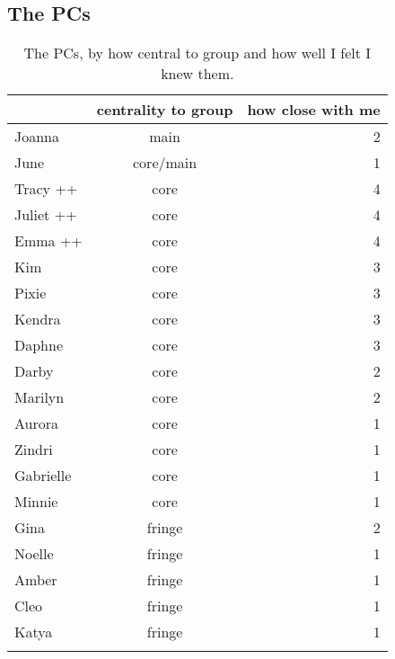 \subsection {The PCs}
\nopagebreak
\begin{table}[ht]
\caption{The PCs, by how central to group and how well I felt I knew them.}\label{PCnames}
	\centering
		\begin{tabular}{lcr} \\
		\lsptoprule
		
			\multirow{2}{*}{\sc name} & \multicolumn{1}{p{2cm}}{\centering \sc centrality to group} & \multicolumn{1}{p{1.75cm}}{\centering \sc how close with me}  \\
			\midrule
			
			Joanna		&		main		&		2  \\\hline
			June			&		core/main &  1 \\\hline
			Tracy ++			&		core		&		4 \\\hline
			Juliet ++	&   core		&		4 \\\hline
			Emma ++		&		core		&		4 \\\hline
			Kim				&		core		&		3 \\\hline
			Pixie			&		core		&		3 \\\hline
			Kendra		&		core		&		3 \\\hline
			Daphne		&		core		&		3 \\\hline
			Darby   	&		core		&		2 \\\hline
			Marilyn 	&		core		&		2 \\\hline
			Aurora		&		core		&		1 \\\hline
			Zindri		&		core		&		1 \\\hline
			Gabrielle	&		core		&		1 \\\hline
			Minnie		&		core		&		1 \\\hline
			Gina			&		fringe	&		2 \\\hline
			Noelle		&		fringe	&		1 \\\hline
			Amber   	&   fringe	&		1 \\\hline
			Cleo			&		fringe	&		1 \\\hline
			Katya			&		fringe	&		1 \\	
			
			   \lspbottomrule
		\end{tabular}
\end{table}


\pagebreak


